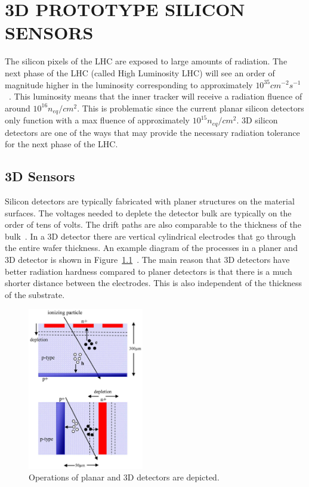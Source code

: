 \chapter{3D PROTOTYPE SILICON SENSORS}

The silicon pixels of the LHC are exposed to large amounts of radiation.  The next phase of the LHC (called High Luminosity LHC) will see an order of magnitude higher in the luminosity corresponding to approximately $10^{35} cm ^{-2}s^{-1}$~\cite{SuperLHC}. This luminosity means that the inner tracker will receive a radiation fluence of around $10^{16}n_{eq}/cm^2$.  This is problematic since the current planar silicon detectors only function with a max fluence of approximately $10^{15}n_{eq}/cm^2$.  3D silicon detectors are one of the ways that may provide the necessary radiation tolerance for the next phase of the LHC.

\section{3D Sensors}

Silicon detectors are typically fabricated with planer structures on the material surfaces.  The voltages needed to deplete the detector bulk are typically on the order of tens of volts.  The drift paths are also comparable to the thickness of the bulk~\cite{3dsilicon}. In a 3D detector there are vertical cylindrical electrodes that go through the entire wafer thickness. An example diagram of the processes in a planer and 3D detector is shown in Figure~\ref{fig:operations_3d}~\cite{5734879}. The main reason that 3D detectors have better radiation hardness compared to planer detectors is that there is a much shorter distance between the electrodes.  This is also independent of the thickness of the substrate.  


\begin{figure}[htb!]
\begin{center}
\centerline{
\includegraphics[width=0.45\textwidth]{3D/processes.pdf}
}
\caption{Operations of planar and 3D detectors are depicted.~\cite{5734879} }
\label{fig:operations_3d}
\end{center}
\end{figure}

